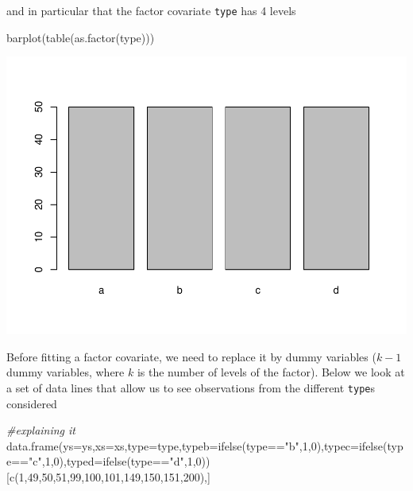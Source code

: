 \documentclass[
]{book}
\newenvironment{Shaded}{\begin{snugshade}}{\end{snugshade}}
\newcommand{\AttributeTok}[1]{\textcolor[rgb]{0.77,0.63,0.00}{#1}}
\newcommand{\CommentTok}[1]{\textcolor[rgb]{0.56,0.35,0.01}{\textit{#1}}}
\newcommand{\DecValTok}[1]{\textcolor[rgb]{0.00,0.00,0.81}{#1}}
\newcommand{\FunctionTok}[1]{\textcolor[rgb]{0.00,0.00,0.00}{#1}}
\newcommand{\NormalTok}[1]{#1}
\newcommand{\SpecialCharTok}[1]{\textcolor[rgb]{0.00,0.00,0.00}{#1}}
\newcommand{\StringTok}[1]{\textcolor[rgb]{0.31,0.60,0.02}{#1}}
\begin{document}
and in particular that the factor covariate \texttt{type} has 4 levels

\begin{Shaded}
\begin{Highlighting}[]
\FunctionTok{barplot}\NormalTok{(}\FunctionTok{table}\NormalTok{(}\FunctionTok{as.factor}\NormalTok{(type)))}
\end{Highlighting}
\end{Shaded}

\includegraphics{ECOMODbook_files/figure-latex/unnamed-chunk-1-1.pdf}

Before fitting a factor covariate, we need to replace it by dummy variables (\(k-1\) dummy variables, where \(k\) is the number of levels of the factor). Below we look at a set of data lines that allow us to see observations from the different \texttt{type}s considered

\begin{Shaded}
\begin{Highlighting}[]
\CommentTok{\#explaining it}
\FunctionTok{data.frame}\NormalTok{(}\AttributeTok{ys=}\NormalTok{ys,}\AttributeTok{xs=}\NormalTok{xs,}\AttributeTok{type=}\NormalTok{type,}\AttributeTok{typeb=}\FunctionTok{ifelse}\NormalTok{(type}\SpecialCharTok{==}\StringTok{"b"}\NormalTok{,}\DecValTok{1}\NormalTok{,}\DecValTok{0}\NormalTok{),}\AttributeTok{typec=}\FunctionTok{ifelse}\NormalTok{(type}\SpecialCharTok{==}\StringTok{"c"}\NormalTok{,}\DecValTok{1}\NormalTok{,}\DecValTok{0}\NormalTok{),}\AttributeTok{typed=}\FunctionTok{ifelse}\NormalTok{(type}\SpecialCharTok{==}\StringTok{"d"}\NormalTok{,}\DecValTok{1}\NormalTok{,}\DecValTok{0}\NormalTok{))[}\FunctionTok{c}\NormalTok{(}\DecValTok{1}\NormalTok{,}\DecValTok{49}\NormalTok{,}\DecValTok{50}\NormalTok{,}\DecValTok{51}\NormalTok{,}\DecValTok{99}\NormalTok{,}\DecValTok{100}\NormalTok{,}\DecValTok{101}\NormalTok{,}\DecValTok{149}\NormalTok{,}\DecValTok{150}\NormalTok{,}\DecValTok{151}\NormalTok{,}\DecValTok{200}\NormalTok{),]}
\end{Highlighting}
\end{Shaded}
\end{document}

